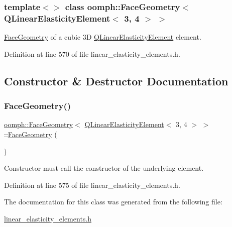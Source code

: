 \subsubsection*{template$<$$>$\newline
class oomph\+::\+Face\+Geometry$<$ Q\+Linear\+Elasticity\+Element$<$ 3, 4 $>$ $>$}

\hyperlink{classoomph_1_1FaceGeometry}{Face\+Geometry} of a cubic 3D \hyperlink{classoomph_1_1QLinearElasticityElement}{Q\+Linear\+Elasticity\+Element} element. 

Definition at line 570 of file linear\+\_\+elasticity\+\_\+elements.\+h.



\subsection{Constructor \& Destructor Documentation}
\mbox{\label{classoomph_1_1FaceGeometry_3_01QLinearElasticityElement_3_013_00_014_01_4_01_4_a738a2c5d9df3d69c737eddcea659ee1d}} 
\subsubsection{\texorpdfstring{Face\+Geometry()}{FaceGeometry()}}
{\footnotesize\ttfamily \hyperlink{classoomph_1_1FaceGeometry}{oomph\+::\+Face\+Geometry}$<$ \hyperlink{classoomph_1_1QLinearElasticityElement}{Q\+Linear\+Elasticity\+Element}$<$ 3, 4 $>$ $>$\+::\hyperlink{classoomph_1_1FaceGeometry}{Face\+Geometry} (\begin{DoxyParamCaption}{ }\end{DoxyParamCaption})\hspace{0.3cm}{\ttfamily [inline]}}



Constructor must call the constructor of the underlying element. 



Definition at line 575 of file linear\+\_\+elasticity\+\_\+elements.\+h.



The documentation for this class was generated from the following file\+:\begin{DoxyCompactItemize}
\item 
\hyperlink{linear__elasticity__elements_8h}{linear\+\_\+elasticity\+\_\+elements.\+h}\end{DoxyCompactItemize}
